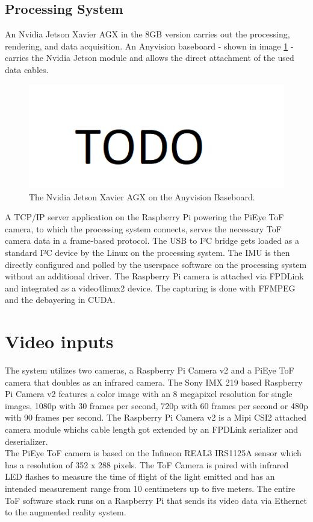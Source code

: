 \subsection{Processing System}
\label{sec:procSystem}
An Nvidia Jetson Xavier AGX in the 8GB version carries out the processing, rendering, and data acquisition. An Anyvision baseboard - shown in image \ref{fig:anyvision} - carries the Nvidia Jetson module and allows the direct attachment of the used data cables.
\begin{figure}[H]
    \centering
    \includegraphics[width=1.0\textwidth]{images/todo.png}
    \caption{The Nvidia Jetson Xavier AGX on the Anyvision Baseboard.}
    \label{fig:anyvision}
\end{figure}
A TCP/IP server application on the Raspberry Pi powering the PiEye ToF camera, to which the processing system connects, serves the necessary ToF camera data in a frame-based protocol. The USB to I²C bridge gets loaded as a standard I²C device by the Linux on the processing system. The IMU is then directly configured and polled by the userspace software on the processing system without an additional driver. The Raspberry Pi camera is attached via FPDLink and integrated as a video4linux2 device. The capturing is done with FFMPEG and the debayering in CUDA.
\section{Video inputs}
\label{sec:videoInputs}
The system utilizes two cameras, a Raspberry Pi Camera v2 and a PiEye ToF camera that doubles as an infrared camera. The Sony IMX 219 based Raspberry Pi Camera v2 features a color image with an 8 megapixel resolution for single images, 1080p with 30 frames per second, 720p with 60 frames per second or 480p with 90 frames per second.\cite{raspiCamSpec} The Raspberry Pi Camera v2 is a Mipi CSI2 attached camera module whichs cable length got extended by an FPDLink serializer and deserializer.\\
The PiEye ToF camera is based on the Infineon REAL3 IRS1125A sensor which has a resolution of 352 x 288 pixels\cite{piEyeShop}. The ToF Camera is paired with infrared LED flashes to measure the time of flight of the light emitted and has an intended measurement range from 10 centimeters up to five meters. The entire ToF software stack runs on a Raspberry Pi that sends its video data via Ethernet to the augmented reality system.\\

